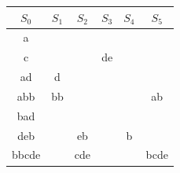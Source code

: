 \documentclass{subfiles}
\begin{document}
    \begin{table}[!h]
        \centering
        \begin{tabular}{|c|c|c|c|c|c|}
            \hline 
            $S_{0}$ & $S_{1}$               & $S_{2}$                   & $S_{3}$               & $S_{4}$               & $S_{5}$ \\ 
            \hline 
            a       &                       &                           &                       &                       & \\
            c       &                       &                           & \textcolor{rpRose}{de}&                       & \\
            ad      & \textcolor{rpLove}{d} &                           &                       &                       & \\
            abb     & \textcolor{rpLove}{bb}&                           &                       &                       & \textcolor{rpFoam}{ab}\\
            bad     &                       &                           &                       &                       & \\
            deb     &                       & \textcolor{rpGold}{eb}    &                       & \textcolor{rpPine}{b} & \\
            bbcde   &                       & \textcolor{rpGold}{cde}   &                       &                       & \textcolor{rpFoam}{bcde} \\
            \hline
        \end{tabular}
    \end{table}
\end{document}
